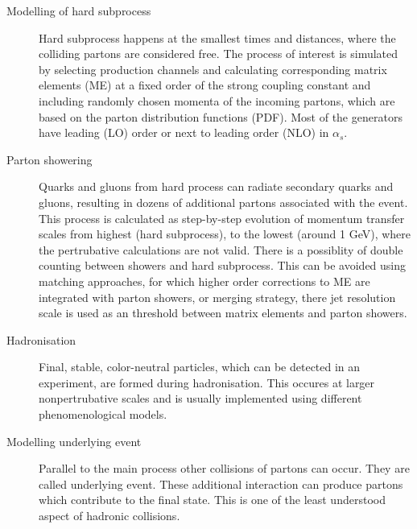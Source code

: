 \begin{description}

\item[Modelling of hard subprocess] Hard subprocess happens at the smallest times and distances, where the colliding partons are considered free. The process of interest is simulated by selecting production channels and calculating corresponding matrix elements (ME)  at a fixed order of the strong coupling constant and including randomly chosen momenta of the incoming partons, which are based on the parton distribution functions (PDF). Most of the generators have leading (LO) order or next to leading order (NLO) in $\alpha_s$. 
\item[Parton showering] Quarks and gluons from hard process can radiate secondary quarks and gluons, resulting in dozens of additional partons associated with the event. This process is calculated as step-by-step evolution of momentum transfer scales from highest (hard subprocess), to the lowest (around 1 GeV), where the pertrubative calculations are not valid. 
There is a possiblity of double counting between showers and hard subprocess. This can be avoided using matching approaches, for which higher order corrections to ME are integrated with parton showers, or merging strategy, there jet resolution scale is used as an threshold between matrix elements and parton showers. 
\item[Hadronisation] Final, stable, color-neutral particles, which can be detected in an experiment, are formed during hadronisation. This occures at larger nonpertrubative scales and  is usually implemented using different phenomenological models.
\item[Modelling underlying event] Parallel to the main process other collisions of partons can occur. They are called underlying event. These additional interaction can produce partons which contribute to the final state. This is one of the least understood aspect of hadronic collisions. 

\end{description}


